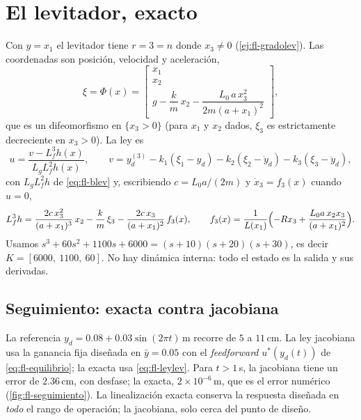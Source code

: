 \section{El levitador, exacto}
\label{sec:fl-levitador}

Con $y=x_1$ el levitador tiene $r=3=n$ donde $x_3\neq0$ (\cref{ej:fl-gradolev}). Las coordenadas son posición, velocidad y aceleración,
\begin{equation}
  \xi=\Phi(x)=\begin{bmatrix}x_1\\ x_2\\ g-\dfrac km\,x_2-\dfrac{L_0\,a\,x_3^2}{2m(a+x_1)^2}\end{bmatrix},
  \label{eq:fl-philev}
\end{equation}
que es un difeomorfismo en $\{x_3>0\}$ (para $x_1$ y $x_2$ dados, $\xi_3$ es estrictamente decreciente en $x_3>0$). La ley es
\begin{equation}
  u=\frac{v-L_f^3h(x)}{L_gL_f^2h(x)},\qquad
  v=y_d^{(3)}-k_1(\xi_1-y_d)-k_2(\xi_2-\dot y_d)-k_3(\xi_3-\ddot y_d),
  \label{eq:fl-leylev}
\end{equation}
con $L_gL_f^2h$ de \eqref{eq:fl-blev} y, escribiendo $c=L_0a/(2m)$ y $\dot x_3=f_3(x)$ cuando $u=0$,
\[
  L_f^3h=\frac{2c\,x_3^2}{(a+x_1)^3}\,x_2-\frac km\,\xi_3-\frac{2c\,x_3}{(a+x_1)^2}\,f_3(x),
  \qquad
  f_3(x)=\frac{1}{L(x_1)}\Bigl(-Rx_3+\frac{L_0a\,x_2x_3}{(a+x_1)^2}\Bigr).
\]
Usamos $s^3+60s^2+1100s+6000=(s+10)(s+20)(s+30)$, es decir $K=[6000,\ 1100,\ 60]$. No hay dinámica interna: todo el estado es la salida y sus derivadas.

\subsection{Seguimiento: exacta contra jacobiana}

La referencia $y_d=0.08+0.03\sin(2\pi t)$\,m recorre de $5$ a $11$\,cm. La ley jacobiana usa la ganancia fija diseñada en $\bar y=0.05$ con el \emph{feedforward} $u^*(y_d(t))$ de \eqref{eq:fl-equilibrio}; la exacta usa \eqref{eq:fl-leylev}. Para $t>1$\,s, la jacobiana tiene un error de $2.36$\,cm, con desfase; la exacta, $2\times10^{-6}$\,m, que es el error numérico (\cref{fig:fl-seguimiento}). La linealización exacta conserva la respuesta diseñada en \emph{todo} el rango de operación; la jacobiana, solo cerca del punto de diseño.

